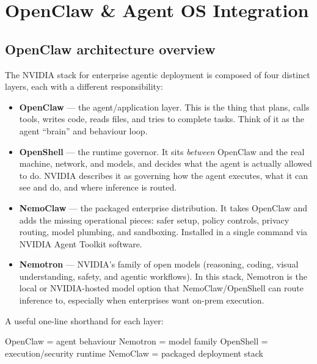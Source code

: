 
\section{OpenClaw \& Agent OS Integration}

\subsection{OpenClaw architecture overview}

The NVIDIA stack for enterprise agentic deployment is composed of four distinct layers,
each with a different responsibility:

\begin{itemize}
  \item \textbf{OpenClaw} --- the agent/application layer. This is the thing that plans,
    calls tools, writes code, reads files, and tries to complete tasks. Think of it as
    the agent ``brain'' and behaviour loop.

  \item \textbf{OpenShell} --- the runtime governor. It sits \emph{between} OpenClaw and
    the real machine, network, and models, and decides what the agent is actually allowed
    to do. NVIDIA describes it as governing how the agent executes, what it can see and
    do, and where inference is routed.

  \item \textbf{NemoClaw} --- the packaged enterprise distribution. It takes OpenClaw and
    adds the missing operational pieces: safer setup, policy controls, privacy routing,
    model plumbing, and sandboxing. Installed in a single command via NVIDIA Agent
    Toolkit software.

  \item \textbf{Nemotron} --- NVIDIA's family of open models (reasoning, coding, visual
    understanding, safety, and agentic workflows). In this stack, Nemotron is the
    local or NVIDIA-hosted model option that NemoClaw/OpenShell can route inference to,
    especially when enterprises want on-prem execution.
\end{itemize}

A useful one-line shorthand for each layer:
\begin{center}
  OpenClaw = agent behaviour \quad
  Nemotron = model family \quad
  OpenShell = execution/security runtime \quad
  NemoClaw = packaged deployment stack
\end{center}

